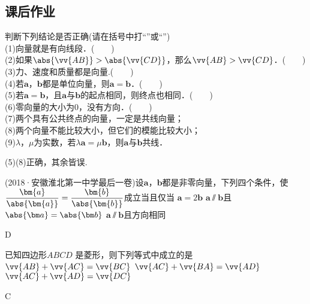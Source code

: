 \begin{Theorem}[平面向量基本定理]
\section{课后作业}
  \begin{exercise}
    \item%
      判断下列结论是否正确(请在括号中打“\checkmark”或“\XSolidBrush”)\\
      (1)向量就是有向线段．(　　)\\
      (2)如果$\abs{\vv{AB}}>\abs{\vv{CD}}$，那么$\vv{AB}>\vv{CD}$．(　　)\\
      (3)力、速度和质量都是向量.(　　)\\
      (4)若$\bm a$，$\bm b$都是单位向量，则$\bm a=\bm b$．(　　)\\
      (5)若$\bm a=\bm b$，且$\bm a$与$\bm b$的起点相同，则终点也相同．(　　)\\
      (6)零向量的大小为0，没有方向．(　　)\\
      (7)两个具有公共终点的向量，一定是共线向量；\\
      (8)两个向量不能比较大小，但它们的模能比较大小；\\
      (9)$\lambda$，$\mu$为实数，若$\lambda\bm{a}=\mu\bm{b}$，则$\bm{a}$与$\bm{b}$共线．
      \begin{answer}
        (5)(8)正确，其余皆误.
      \end{answer}
    \item
      (2018·安徽淮北第一中学最后一卷)设$\bm{a}$，$\bm{b}$都是非零向量，下列四个条件，使$\dfrac{\bm{a}}{\abs{\bm{a}}}=\dfrac{\bm{b}}{\abs{\bm{b}}}$成立当且仅当\xz
      {$\bm a=2\bm b$}
      {$\bm a\varparallel\bm b$且$\abs{\bm a}=\abs{\bm b}$}
      {$\bm a\varparallel\bm b$且方向相同}
      \begin{answer}
        D
      \end{answer}
    \item
      已知四边形$ABCD$ 是菱形，则下列等式中成立的是\xz
        {$\vv{AB}+\vv{AC}=\vv{BC}$}
        {$\vv{AC}+\vv{BA}=\vv{AD}$}
        {$\vv{AC}+\vv{AD}=\vv{DC}$}
      \begin{answer}
        C
      \end{answer}

\end{exercise}
\end{Theorem}
